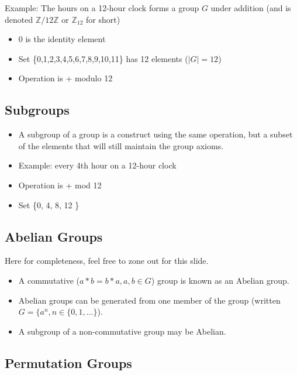 \documentclass[xcolor=pdftex,dvipsnames,table]{beamer}
\begin{document}
\begin{frame}
  Example: The hours on a 12-hour clock forms a group $G$ under addition (and is denoted $ \mathbb{Z} / 12\mathbb{Z}$ or $\mathbb{Z}_{12}$ for short)
  \begin{itemize}
    \item 0 is the identity element
    \item Set \{0,1,2,3,4,5,6,7,8,9,10,11\} has 12 elements ($|G| = 12$)
    \item Operation is + modulo 12
  \end{itemize}
  
\end{frame}

\subsection{Subgroups}
\begin{frame}
  \begin{itemize}
    \item A subgroup of a group is a construct using the same operation, but a subset of the elements that will still maintain the group axioms.
    \item Example: every 4th hour on a 12-hour clock
    \item Operation is + mod 12
    \item Set \{0, 4, 8, 12 \}
  \end{itemize}
\end{frame}

\subsection{Abelian Groups}
\begin{frame}
  Here for completeness, feel free to zone out for this slide.
  \begin{itemize}
    \item A commutative ($a * b = b * a, a, b \in G$) group is known as an Abelian group.
    \item Abelian groups can be generated from one member of the group (written $G = \{ a^n, n \in \{0, 1, \hdots \}$).
    \item A subgroup of a non-commutative group may be Abelian.
  \end{itemize}
\end{frame}

\subsection{Permutation Groups}
\end{document}
